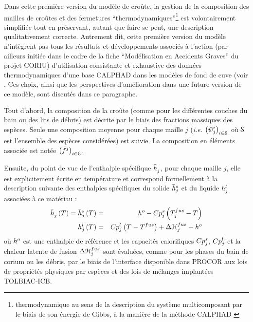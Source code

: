 Dans cette première version du modèle de croûte, la gestion de la composition des mailles de croûtes et des fermetures ``thermodynamiques''\footnote{thermodynamique au sens de la description du système multicomposant par le biais de son énergie de Gibbs, à la manière de la méthode CALPHAD \cite{Lukas2007}} est volontairement simplifiée tout en préservant, autant que faire se peut, une description qualitativement correcte. Autrement dit, cette première version du modèle n'intègrent pas tous les résultats et développements associés à l'action (par ailleurs initiée dans le cadre de la fiche ``Modélisation en Accidents Graves'' du projet CORIU) d'utilisation consistante et exhaustive des données thermodynamiques d'une base CALPHAD dans les modèles de fond de cuve (voir \cite{LeTellier2016b,Tiwari2018,LeTellier2019}. Ces choix, ainsi que les perspectives d'amélioration dans une future version de ce modèle, sont discutés dans ce paragraphe.

Tout d'abord, la composition de la croûte (comme pour les différentes couches du bain ou des lits de débris) est décrite par le biais des fractions massiques des espèces. Seule une composition moyenne pour chaque maille $j$  (\textit{i.e.} $\left(\avMassFraction[i]{j}\right)_{i\in \speciesSet}$ où $\speciesSet$ est l'ensemble des espèces considérées) est suivie. La composition en éléments associée est notée $\left(\elementMassFraction[j]{}\right)_{i\in\elementSet}$.

Ensuite, du point de vue de l'enthalpie spécifique $\avMassEnthalpy{j}$, pour chaque maille $j$, elle est explicitement écrite en température et correspond formellement à la description suivante des enthalpies spécifiques du solide $\avMassEnthalpy[s]{j}$ et du liquide $\massEnthalpy[l]{j}$ associées à ce matériau :
\begin{eqnarray}
 \avMassEnthalpy{j} \left(\temperature{}\right) = \avMassEnthalpy[s]{j} \left(\temperature{}\right) &=& \massEnthalpy[o]{} - \heatCp[s]{j} \left(\temperature[fus]{j} - \temperature{}\right) \\
 \massEnthalpy[l]{j} \left(\temperature{}\right) &=& \heatCp[l]{j} \left(\temperature{} - \temperature[fus]{}\right) + \dEnthalpy[fus]{j} + \massEnthalpy[o]{}
\end{eqnarray}
où $\massEnthalpy[o]{}$ est une enthalpie de référence et les capacités calorifiques $\heatCp[s]{j}$, $\heatCp[l]{j}$ et la chaleur latente de fusion $\dEnthalpy[fus]{j}$ sont évaluées, comme pour les phases du bain de corium ou les débris, par le biais de l'interface disponible dans PROCOR aux lois de propriétés physiques par espèces et des lois de mélanges implantées TOLBIAC-ICB.

